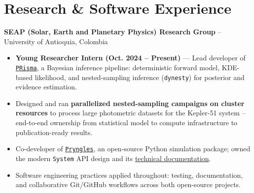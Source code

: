 \section*{Research \& Software Experience}
\textbf{SEAP (Solar, Earth and Planetary Physics) Research Group} -- University of Antioquia, Colombia
\begin{itemize}
    \item \textbf{Young Researcher Intern (Oct. 2024 -- Present)} — Lead developer of \href{https://github.com/seap-udea/PRisma}{\texttt{PRisma}}, a Bayesian inference pipeline: deterministic forward model, KDE-based likelihood, and nested-sampling inference (\texttt{dynesty}) for posterior and evidence estimation.
    \item Designed and ran \textbf{parallelized nested-sampling campaigns on cluster resources} to process large photometric datasets for the Kepler-51 system -- end-to-end ownership from statistical model to compute infrastructure to publication-ready results.
    \item Co-developer of \href{https://github.com/seap-udea/pryngles}{\texttt{Pryngles}}, an open-source Python simulation package; owned the modern \texttt{System} API design and its \href{https://pryngles.readthedocs.io}{technical documentation}.
    \item Software engineering practices applied throughout: testing, documentation, and collaborative Git/GitHub workflows across both open-source projects.
\end{itemize}
